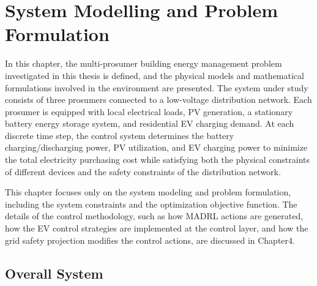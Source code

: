 
\chapter{System Modelling and Problem Formulation}\label{chapter:system-modelling}

In this chapter, the multi-prosumer building energy management problem investigated in this thesis is defined, and the physical models and mathematical formulations involved in the environment are presented. The system under study consists of three prosumers connected to a low-voltage distribution network. Each prosumer is equipped with local electrical loads, PV generation, a stationary battery energy storage system, and residential EV charging demand. At each discrete time step, the control system determines the battery charging/discharging power, PV utilization, and EV charging power to minimize the total electricity purchasing cost while satisfying both the physical constraints of different devices and the safety constraints of the distribution network.

This chapter focuses only on the system modeling and problem formulation, including the system constraints and the optimization objective function. The details of the control methodology, such as how MADRL actions are generated, how the EV control strategies are implemented at the control layer, and how the grid safety projection modifies the control actions, are discussed in Chapter4.

\section{Overall System}

